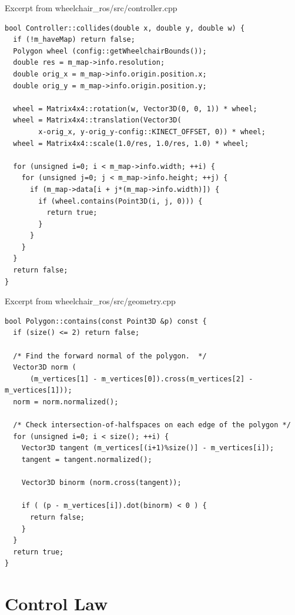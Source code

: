 \documentclass[oneside,final,a4paper]{report}
\begin{document}
Excerpt from wheelchair\_ros/src/controller.cpp
\begin{lstlisting}
bool Controller::collides(double x, double y, double w) {
  if (!m_haveMap) return false;
  Polygon wheel (config::getWheelchairBounds());
  double res = m_map->info.resolution;
  double orig_x = m_map->info.origin.position.x;
  double orig_y = m_map->info.origin.position.y;

  wheel = Matrix4x4::rotation(w, Vector3D(0, 0, 1)) * wheel;
  wheel = Matrix4x4::translation(Vector3D(
        x-orig_x, y-orig_y-config::KINECT_OFFSET, 0)) * wheel;
  wheel = Matrix4x4::scale(1.0/res, 1.0/res, 1.0) * wheel;
  
  for (unsigned i=0; i < m_map->info.width; ++i) {
    for (unsigned j=0; j < m_map->info.height; ++j) {
      if (m_map->data[i + j*(m_map->info.width)]) {
        if (wheel.contains(Point3D(i, j, 0))) {
          return true;
        }
      }
    }
  }
  return false;
}
\end{lstlisting}

Excerpt from wheelchair\_ros/src/geometry.cpp

\begin{lstlisting}
bool Polygon::contains(const Point3D &p) const {
  if (size() <= 2) return false;

  /* Find the forward normal of the polygon.  */
  Vector3D norm (
      (m_vertices[1] - m_vertices[0]).cross(m_vertices[2] - m_vertices[1]));
  norm = norm.normalized();

  /* Check intersection-of-halfspaces on each edge of the polygon */
  for (unsigned i=0; i < size(); ++i) {
    Vector3D tangent (m_vertices[(i+1)%size()] - m_vertices[i]);
    tangent = tangent.normalized();
    
    Vector3D binorm (norm.cross(tangent));

    if ( (p - m_vertices[i]).dot(binorm) < 0 ) {
      return false;  
    }
  }
  return true;
}
\end{lstlisting}

\clearpage
\section{Control Law}
\label{appendix:control_law}
\end{document}
